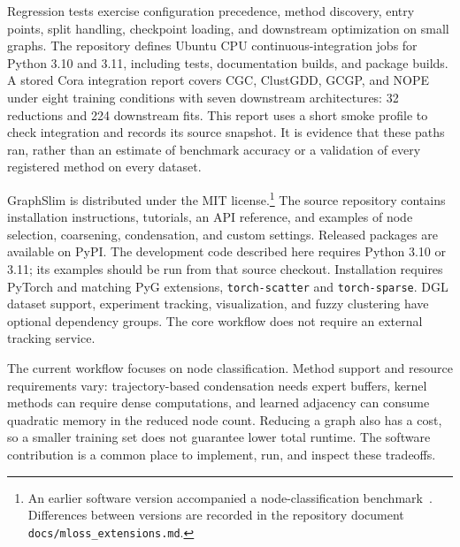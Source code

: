 \documentclass[twoside,11pt]{article}
\begin{document}
Regression tests exercise configuration precedence, method discovery, entry
points, split handling, checkpoint loading, and downstream optimization on
small graphs. The repository defines Ubuntu CPU continuous-integration jobs
for Python 3.10 and 3.11, including tests, documentation builds, and package
builds. A stored Cora integration report covers CGC, ClustGDD, GCGP, and NOPE under
eight training conditions with seven downstream architectures: 32 reductions
and 224 downstream fits. This report uses a short smoke profile to check
integration and records its source snapshot. It is evidence that these paths
ran, rather than an estimate of benchmark accuracy or a validation of every
registered method on every dataset.

GraphSlim is distributed under the MIT license.\footnote{An earlier software
version accompanied a node-classification benchmark~\citep{gong2025gc4nc}.
Differences between versions are recorded in the repository document
\texttt{docs/mloss\_extensions.md}.} The source repository contains
installation instructions, tutorials, an API reference, and examples of node
selection, coarsening, condensation, and custom settings. Released packages
are available on PyPI. The development code described here requires Python
3.10 or 3.11; its examples should be run from that source checkout. Installation
requires PyTorch and matching PyG extensions, \texttt{torch-scatter} and
\texttt{torch-sparse}. DGL dataset support, experiment tracking, visualization, and fuzzy
clustering have optional dependency groups. The core workflow does not require
an external tracking service.

The current workflow focuses on node classification. Method support and resource
requirements vary: trajectory-based condensation needs expert buffers, kernel
methods can require dense computations, and learned adjacency can consume
quadratic memory in the reduced node count. Reducing a graph also has a cost,
so a smaller training set does not guarantee lower total runtime. The software
contribution is a common place to implement, run, and inspect these tradeoffs.
\end{document}
